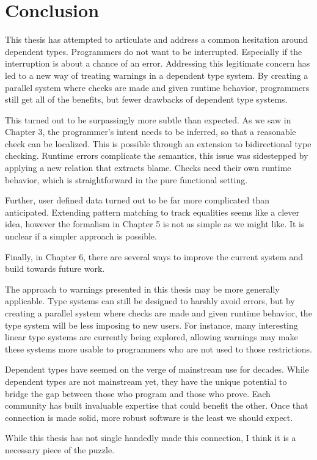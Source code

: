 \chapter{Conclusion}
\label{chapter:Conclusion}
\thispagestyle{myheadings}

This thesis has attempted to articulate and address a common hesitation around dependent types.
Programmers do not want to be interrupted.
Especially if the interruption is about a chance of an error.
Addressing this legitimate concern has led to a new way of treating warnings in a dependent type system.
By creating a parallel system where checks are made and given runtime behavior, programmers still get all of the benefits, but fewer drawbacks of dependent type systems.

This turned out to be surpassingly more subtle than expected.
As we saw in Chapter 3, the programmer's intent needs to be inferred, so that a reasonable check can be localized.
This is possible through an extension to bidirectional type checking.
Runtime errors complicate the semantics, this issue was sidestepped by applying a new relation that extracts blame.
Checks need their own runtime behavior, which is straightforward in the pure functional setting.

Further, user defined data turned out to be far more complicated than anticipated.
Extending pattern matching to track equalities seems like a clever idea, however the formalism in Chapter 5 is not as simple as we might like.
It is unclear if a simpler approach is possible.

Finally, in Chapter 6, there are several ways to improve the current system and build towards future work.

The approach to warnings presented in this thesis may be more generally applicable.
Type systems can still be designed to harshly avoid errors, but by creating a parallel system where checks are made and given runtime behavior, the type system will be less imposing to new users.
For instance, many interesting linear type systems are currently being explored, allowing warnings may make these systems more usable to programmers who are not used to those restrictions.

Dependent types have seemed on the verge of mainstream use for decades.
While dependent types are not mainstream yet, they have the unique potential to bridge the gap between those who program and those who prove.
Each community has built invaluable expertise that could benefit the other.
Once that connection is made solid, more robust software is the least we should expect.

While this thesis has not single handedly made this connection, I think it is a necessary piece of the puzzle.

